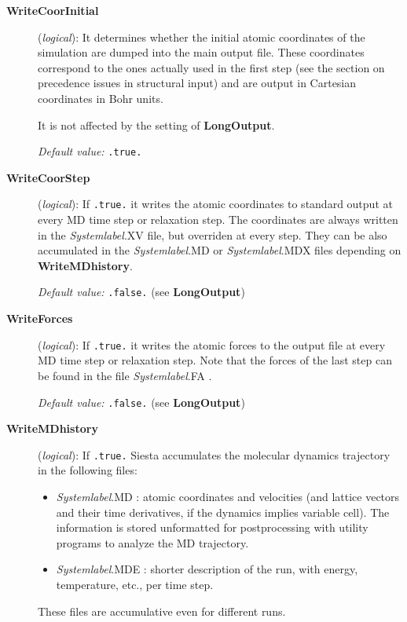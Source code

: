 \documentclass[11pt]{article}
\begin{document}
\begin{description}
\item[{\bf WriteCoorInitial}] ({\it logical}):
It determines whether the initial atomic coordinates of the simulation are
dumped into the main output file. These coordinates correspond to the
ones actually used in the first step (see the section on precedence
issues in structural input) and are output in Cartesian coordinates in
Bohr units.

It is not affected by the setting of {\bf LongOutput}.

{\it Default value:} {\tt .true.}


\item[{\bf WriteCoorStep}] ({\it logical}):   If {\tt .true.} it writes the atomic coordinates to standard
  output at every MD time step or relaxation step. The coordinates are
  always written in the {\it Systemlabel}.XV file, but overriden at
  every step. They can be also accumulated in the {\it Systemlabel}.MD
  or {\it Systemlabel}.MDX files depending on {\bf
    WriteMDhistory}.


{\it Default value:} {\tt .false.} (see {\bf LongOutput})


\item[{\bf WriteForces}] ({\it logical}):  If {\tt .true.} it writes the
  atomic forces to the output file at every MD time step or relaxation
  step.  Note that the forces of the last step can be found in the
  file {\it Systemlabel}.FA .

{\it Default value:} {\tt .false.} (see {\bf LongOutput})

\item[{\bf WriteMDhistory}] ({\it logical}):
    If {\tt .true.} {\sc Siesta} accumulates the
  molecular dynamics trajectory in the following files:
\begin{itemize}
\item
{\it Systemlabel}.MD : atomic coordinates and velocities (and lattice
vectors and their time derivatives, if the dynamics implies variable
cell). The information is stored unformatted for postprocessing with
utility programs to analyze the MD trajectory.
\item
{\it Systemlabel}.MDE : shorter description of the run, with energy,
temperature, etc., per time step.
\end{itemize}
These files are accumulative even for different runs.


\end{description}
\end{document}

